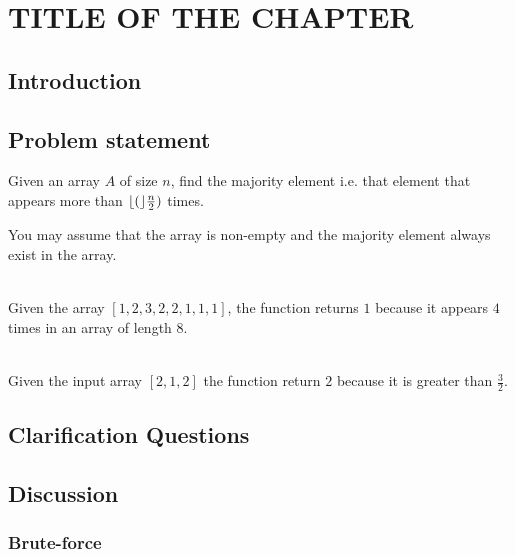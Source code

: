 %

\chapter{TITLE OF THE CHAPTER}
\label{ch:majority_element}
\section*{Introduction}

\section{Problem statement}
\begin{exercise}
Given an array $A$ of size $n$, find the majority element i.e. that element that appears more than $\lfloor(\rfloor\frac{n}{2})$ times.

You may assume that the array is non-empty and the majority element always exist in the array.

	\begin{example}
		\hfill \\
		Given the array $[1,2,3,2,2,1,1,1]$, the function returns $1$ because it appears $4$ times in an array of length $8$.
		
	\end{example}

	\begin{example}
		\hfill \\
		Given the input array $[2, 1, 2]$ the function return $2$ because it is greater than $\frac{3}{2}$.
		
	\end{example}
\end{exercise}

\section{Clarification Questions}

\begin{QandA}
	\item 
	\begin{answered}
		\textit{}
	\end{answered}
	
\end{QandA}

\section{Discussion}
\label{majority_element:sec:discussion}


\subsection{Brute-force}
\label{majority_element:sec:bruteforce}



